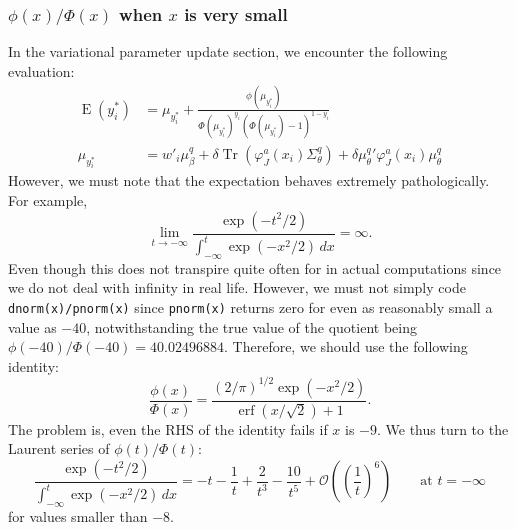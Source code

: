 \documentclass[11pt]{article}
\DeclareMathOperator{\Tr}{Tr}
\newcommand{\opn}{\operatorname}
\begin{document}
\subsubsection{$\phi\left(x\right)/\Phi\left(x\right)$ when $x$ is very small}
In the variational parameter update section, we encounter the following evaluation:
\begin{align*}
  \opn{E}\left(y_{i}^{*}\right) &= \mu_{y_{i}^{*}} + \frac{\phi\left(\mu_{y_{i}^{*}}\right)}{\Phi\left(\mu_{y_{i}^{*}}\right)^{y_{i}}\left(\Phi\left(\mu_{y_{i}^{*}}\right)-1\right)^{1-y_{i}}}\\
  \mu_{y_{i}^{*}} &= w'_{i}\mu_{\beta}^{q} + \delta\Tr\left(\varphi_{J}^{a}\left(x_{i}\right)\Sigma_{\theta}^{q}\right) + \delta{\mu_{\theta}^{q}}'\varphi_{J}^{a}\left(x_{i}\right)\mu_{\theta}^{q}
\end{align*}
However, we must note that the expectation behaves extremely pathologically. For example,
\begin{equation*}
  \lim_{t\to-\infty} \frac{\exp\left(-t^{2}/2\right)}{\int_{-\infty}^{t}\exp\left(-x^{2}/2\right)\, dx} = \infty.
\end{equation*}
Even though this does not transpire quite often for in actual computations since we do not deal with infinity in real life. However, we must not simply code \texttt{dnorm(x)/pnorm(x)} since \texttt{pnorm(x)} returns zero for even as reasonably small a value as $-40$, notwithstanding the true value of the quotient being $\phi\left(-40\right)/\Phi\left(-40\right)=40.02496884$. Therefore, we should use the following identity:
\begin{equation*}
  \frac{\phi\left(x\right)}{\Phi\left(x\right)} = \frac{\left(2/\pi\right)^{1/2}\exp\left(-x^{2}/2\right)}{\opn{erf}\left(x/\sqrt{2}\right)+1}.
\end{equation*}
The problem is, even the RHS of the identity fails if $x$ is $-9$. We thus turn to the Laurent series of $\phi\left(t\right)/\Phi\left(t\right)$:
\begin{equation*}
  \frac{\exp\left(-t^{2}/2\right)}{\int_{-\infty}^{t}\exp\left(-x^{2}/2\right)\, dx} = -t-\frac{1}{t}+\frac{2}{t^{3}} -\frac{10}{t^{5}} + \mathcal{O}\left(\left(\frac{1}{t}\right)^{6}\right)\qquad \text{at $t=-\infty$}
\end{equation*}
for values smaller than $-8$.
\end{document}
